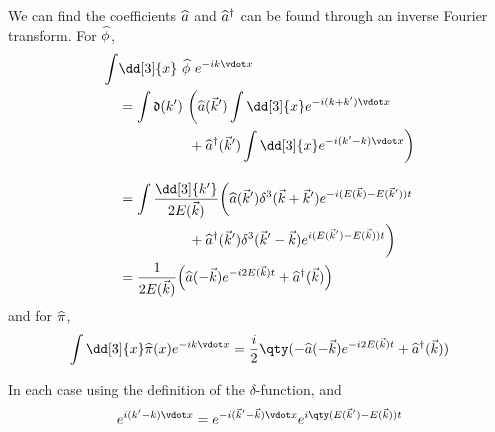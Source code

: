 \begin{derivation}
  We can find the coefficients ${\widehat{a}}$ and ${\widehat{a}}^{\dagger}$ can be found
  through an inverse Fourier transform.  For ${\widehat{\phi}}$,
\begin{align*}
\int & \dd[3]{x}  \ \Op{\phi} \ e^{-ik \vdot x} \\ 
     & =  \int \nm{k'}   \bigg( \Op{a}(\vec{k}') \int \dd[3]{x} e^{-i (k+k') \vdot x}   \\ 
     & \qquad \qquad \quad+ \hOp{a}(\vec{k}') \int \dd[3]{x} e^{-i(k'-k) \vdot x} \bigg) \\[1em] 
     & =  \int \frac{\dd[3]{k'}}{2 E(\vec{k})} \bigg(\Op{a}(\vec{k}') \delta^3(\vec{k} + \vec{k}') e^{-i (E(\vec{k}) - E(\vec{k}'))t}  \\
     & \qquad \qquad \quad+  \hOp{a}(\vec{k}') \delta^3(\vec{k}' - \vec{k}) e^{i(E(\vec{k}') - E(\vec{k}))t} \bigg) \\ 
     & = \frac{1}{2 E(\vec{k})} \Big(\Op{a}(-\vec{k}) e ^{-i2E(\vec{k})t} + \hOp{a}(\vec{k}) \Big)
\end{align*}
and for ${\widehat{\pi}}$,
\begin{equation*}
  \int \dd[3]{x} \Op{\pi}(x) e^{-i k \vdot x} = \frac{i}{2}
   \qty( -\Op{a}(-\vec{k}) e^{-i 2 E(\vec{k})t} + \hOp{a}(\vec{k}) )
\end{equation*}

In each case using the definition of the $\delta$-function, and 
\[ 
   e^{i(k' - k) \vdot x} = e^{-i (\vec{k}' - \vec{k}) \vdot x}
                       e^{i \qty( E(\vec{k}') - E(\vec{k}) ) t}
\]


\end{derivation}
